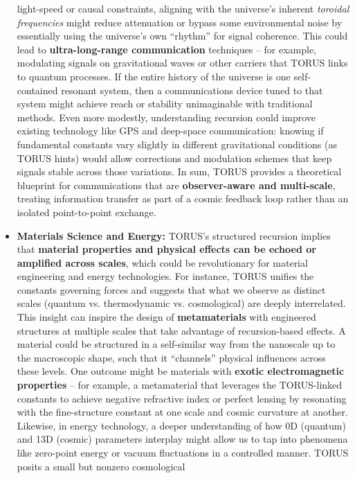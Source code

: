 \documentclass[]{article}
\begin{document}
\begin{itemize}
  light-speed or causal constraints, aligning with the universe's
  inherent \emph{toroidal frequencies} might reduce attenuation or
  bypass some environmental noise by essentially using the universe's
  own ``rhythm'' for signal coherence. This could lead to
  \textbf{ultra-long-range communication} techniques -- for example,
  modulating signals on gravitational waves or other carriers that TORUS
  links to quantum processes. If the entire history of the universe is
  one self-contained resonant system, then a communications device tuned
  to that system might achieve reach or stability unimaginable with
  traditional methods. Even more modestly, understanding recursion could
  improve existing technology like GPS and deep-space communication:
  knowing if fundamental constants vary slightly in different
  gravitational conditions (as TORUS hints​) would allow corrections and
  modulation schemes that keep signals stable across those variations.
  In sum, TORUS provides a theoretical blueprint for communications that
  are \textbf{observer-aware and multi-scale}, treating information
  transfer as part of a cosmic feedback loop rather than an isolated
  point-to-point exchange.
\item
  \textbf{Materials Science and Energy:} TORUS's structured recursion
  implies that \textbf{material properties and physical effects can be
  echoed or amplified across scales}, which could be revolutionary for
  material engineering and energy technologies. For instance, TORUS
  unifies the constants governing forces and suggests that what we
  observe as distinct scales (quantum vs. thermodynamic vs.
  cosmological) are deeply interrelated​. This insight can inspire the
  design of \textbf{metamaterials} with engineered structures at
  multiple scales that take advantage of recursion-based effects. A
  material could be structured in a self-similar way from the nanoscale
  up to the macroscopic shape, such that it ``channels'' physical
  influences across these levels. One outcome might be materials with
  \textbf{exotic electromagnetic properties} -- for example, a
  metamaterial that leverages the TORUS-linked constants to achieve
  negative refractive index or perfect lensing by resonating with the
  fine-structure constant at one scale and cosmic curvature at another.
  Likewise, in energy technology, a deeper understanding of how 0D
  (quantum) and 13D (cosmic) parameters interplay might allow us to tap
  into phenomena like zero-point energy or vacuum fluctuations in a
  controlled manner. TORUS posits a small but nonzero cosmological

\end{itemize}
\end{document}
